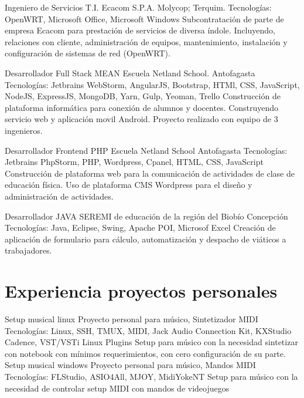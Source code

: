 \documentclass[draft,color,12pt,letterpaper,sans]{moderncv}
\begin{document}
{Ingeniero de Servicios T.I.}
{Ecacom S.P.A.}
{Molycop; Terquim. }
{\newline Tecnologías: OpenWRT, Microsoft Office, Microsoft Windows}
{Subcontratación de parte de empresa Ecacom para prestación de servicios de diversa índole. Incluyendo, relaciones con cliente, administración de equipos, mantenimiento, instalación y configuración de sistemas de red (OpenWRT).\newline}

{Desarrollador Full Stack MEAN}
{Escuela Netland School.}
{Antofagasta}
{\newline Tecnologías: Jetbrains WebStorm, AngularJS, Bootstrap, HTMl, CSS, JavaScript, NodeJS, ExpressJS, MongoDB, Yarn, Gulp, Yeoman, Trello}
{Construcción de plataforma informática para conexión de alumnos y docentes. Construyendo servicio web y aplicación movil Android. Proyecto realizado con equipo de 3 ingenieros. \newline}

{Desarrollador Frontend PHP}
{Escuela Netland School}
{Antofagasta}
{\newline Tecnologías: Jetbrains PhpStorm, PHP, Wordpress, Cpanel, HTML, CSS, JavaScript}
{Construcción de plataforma web para la comunicación de actividades de clase de educación física. Uso de plataforma CMS Wordpress para el dise\~no y administración de actividades.\newline}

{Desarrollador JAVA}
{SEREMI de educación de la región del Biobío}
{Concepción}
{\newline Tecnologías: Java, Eclipse, Swing, Apache POI, Microsof Excel}
{Creación de aplicación de formulario para cálculo, automatización y despacho de viáticos a trabajadores.\newline}


\section{Experiencia proyectos personales}

\cventry {}
{Setup musical linux}
{Proyecto personal para músico, Sintetizador MIDI}
{}
{\newline Tecnologías: Linux, SSH, TMUX, MIDI, Jack Audio Connection Kit, KXStudio Cadence, VST/VSTi Linux Plugins}
{Setup para músico con la necesidad sintetizar con notebook con mínimos requerimientos, con cero configuración de su parte.\newline}
\cventry {}
{Setup musical windows}
{Proyecto personal para músico, Mandos MIDI}
{}
{\newline Tecnologías: FLStudio, ASIO4All, MJOY, MidiYokeNT}
{Setup para músico con la necesidad de controlar setup MIDI con mandos de videojuegos\newline}
\end{document}
